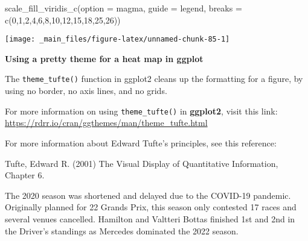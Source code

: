 \documentclass[
]{book}
\newenvironment{Shaded}{\begin{snugshade}}{\end{snugshade}}
\newcommand{\AttributeTok}[1]{\textcolor[rgb]{0.77,0.63,0.00}{#1}}
\newcommand{\DecValTok}[1]{\textcolor[rgb]{0.00,0.00,0.81}{#1}}
\newcommand{\FunctionTok}[1]{\textcolor[rgb]{0.00,0.00,0.00}{#1}}
\newcommand{\NormalTok}[1]{#1}
\newcommand{\StringTok}[1]{\textcolor[rgb]{0.31,0.60,0.02}{#1}}
\begin{document}
\begin{Shaded}
\begin{Highlighting}[]
  \FunctionTok{scale\_fill\_viridis\_c}\NormalTok{(}\AttributeTok{option =} \StringTok{\textquotesingle{}magma\textquotesingle{}}\NormalTok{,}
                       \AttributeTok{guide =} \StringTok{\textquotesingle{}legend\textquotesingle{}}\NormalTok{,}
                       \AttributeTok{breaks =} \FunctionTok{c}\NormalTok{(}\DecValTok{0}\NormalTok{,}\DecValTok{1}\NormalTok{,}\DecValTok{2}\NormalTok{,}\DecValTok{4}\NormalTok{,}\DecValTok{6}\NormalTok{,}\DecValTok{8}\NormalTok{,}\DecValTok{10}\NormalTok{,}\DecValTok{12}\NormalTok{,}\DecValTok{15}\NormalTok{,}\DecValTok{18}\NormalTok{,}\DecValTok{25}\NormalTok{,}\DecValTok{26}\NormalTok{))}
\end{Highlighting}
\end{Shaded}

\begin{center}\texttt{[image: \_main\_files/figure-latex/unnamed-chunk-85-1]} \end{center}

\begin{blackbox}

\begin{center}
\textbf{Using a pretty theme for a heat map in ggplot}

\end{center}

The \texttt{theme\_tufte()} function in ggplot2 cleans up the formatting for a figure, by using no border, no axis lines, and no grids.

For more information on using \texttt{theme\_tufte()} in \textbf{ggplot2}, visit this link: \url{https://rdrr.io/cran/ggthemes/man/theme_tufte.html}

For more information about Edward Tufte's principles, see this reference:

Tufte, Edward R. (2001) The Visual Display of Quantitative Information, Chapter 6.

\end{blackbox}

The 2020 season was shortened and delayed due to the COVID-19 pandemic. Originally planned for 22 Grands Prix, this season only contested 17 races and several venues cancelled. Hamilton and Valtteri Bottas finished 1st and 2nd in the Driver's standings as Mercedes dominated the 2022 season.
\end{document}
